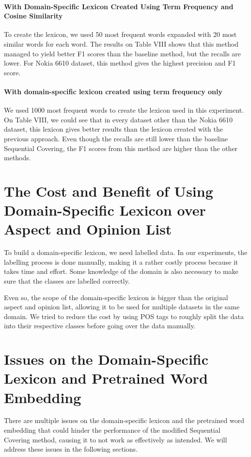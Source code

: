 \documentclass[a4paper,conference]{IEEEtran}
\begin{document}
\paragraph{With Domain-Specific Lexicon Created Using Term Frequency and Cosine Similarity}
To create the lexicon, we used 50 most frequent words expanded with 20 most similar words for each word. The results on Table VIII shows that this method managed to yield better F1 scores than the baseline method, but the recalls are lower. For Nokia 6610 dataset, this method gives the highest precision and F1 score.
\paragraph{With domain-specific lexicon created using term frequency only}
We used 1000 most frequent words to create the lexicon used in this experiment. On Table VIII, we could see that in every dataset other than the Nokia 6610 dataset, this lexicon gives better results than the lexicon created with the previous approach. Even though the recalls are still lower than the baseline Sequential Covering, the F1 scores from this method are higher than the other methods.

\section{The Cost and Benefit of Using Domain-Specific Lexicon over Aspect and Opinion List}
To build a domain-specific lexicon, we need labelled data. In our experiments, the labelling process is done manually, making it a rather costly process because it takes time and effort. Some knowledge of the domain is also necessary to make sure that the classes are labelled correctly.

Even so, the scope of the domain-specific lexicon is bigger than the original aspect and opinion list, allowing it to be used for multiple datasets in the same domain. We tried to reduce the cost by using POS tags to roughly split the data into their respective classes before going over the data manually.

\section{Issues on the Domain-Specific Lexicon and Pretrained Word Embedding}
There are multiple issues on the domain-specific lexicon and the pretrained word embedding that could hinder the performance of the modified Sequential Covering method, causing it to not work as effectively as intended. We will address these issues in the following sections.
\end{document}
